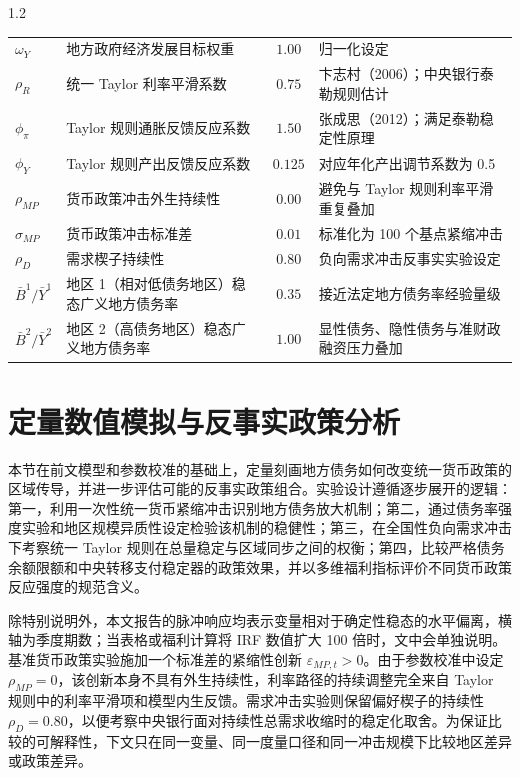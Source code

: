 \documentclass[12pt,UTF8]{ctexart}
\begin{document}
\begin{spacing}{1.2}
\begin{table}[H]
{\begin{tabular}{llcl}
				$\omega_Y$ & 地方政府经济发展目标权重 & $1.00$ & 归一化设定 \\
				$\rho_R$ & 统一 Taylor 利率平滑系数 & $0.75$ & 卞志村（2006）；中央银行泰勒规则估计 \\
				$\phi_\pi$ & Taylor 规则通胀反馈反应系数 & $1.50$ & 张成思（2012）；满足泰勒稳定性原理 \\
				$\phi_Y$ & Taylor 规则产出反馈反应系数 & $0.125$ & 对应年化产出调节系数为 0.5 \\
				$\rho_{MP}$ & 货币政策冲击外生持续性 & $0.00$ & 避免与 Taylor 规则利率平滑重复叠加 \\
				$\sigma_{MP}$ & 货币政策冲击标准差 & $0.01$ & 标准化为 100 个基点紧缩冲击 \\
				$\rho_D$ & 需求楔子持续性 & $0.80$ & 负向需求冲击反事实实验设定 \\
				$\bar{B}^1/\bar{Y}^1$ & 地区 1（相对低债务地区）稳态广义地方债务率 & $0.35$ & 接近法定地方债务率经验量级 \\
				$\bar{B}^2/\bar{Y}^2$ & 地区 2（高债务地区）稳态广义地方债务率 & $1.00$ & 显性债务、隐性债务与准财政融资压力叠加 \\
				\bottomrule
			\end{tabular}}
		\end{table}
		
		\section{定量数值模拟与反事实政策分析}
		
		本节在前文模型和参数校准的基础上，定量刻画地方债务如何改变统一货币政策的区域传导，并进一步评估可能的反事实政策组合。实验设计遵循逐步展开的逻辑：第一，利用一次性统一货币紧缩冲击识别地方债务放大机制；第二，通过债务率强度实验和地区规模异质性设定检验该机制的稳健性；第三，在全国性负向需求冲击下考察统一 Taylor 规则在总量稳定与区域同步之间的权衡；第四，比较严格债务余额限额和中央转移支付稳定器的政策效果，并以多维福利指标评价不同货币政策反应强度的规范含义。
		
		除特别说明外，本文报告的脉冲响应均表示变量相对于确定性稳态的水平偏离，横轴为季度期数；当表格或福利计算将 IRF 数值扩大 100 倍时，文中会单独说明。基准货币政策实验施加一个标准差的紧缩性创新 $\varepsilon_{MP,t}>0$。由于参数校准中设定 $\rho_{MP}=0$，该创新本身不具有外生持续性，利率路径的持续调整完全来自 Taylor 规则中的利率平滑项和模型内生反馈。需求冲击实验则保留偏好楔子的持续性 $\rho_D=0.80$，以便考察中央银行面对持续性总需求收缩时的稳定化取舍。为保证比较的可解释性，下文只在同一变量、同一度量口径和同一冲击规模下比较地区差异或政策差异。
		

\end{spacing}
\end{document}
